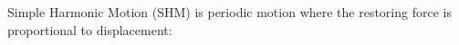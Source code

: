 \documentclass[preview]{standalone}
\begin{document}
\begin{center}
Simple Harmonic Motion (SHM) is periodic motion where the restoring force is proportional to displacement:
\end{center}
\end{document}
